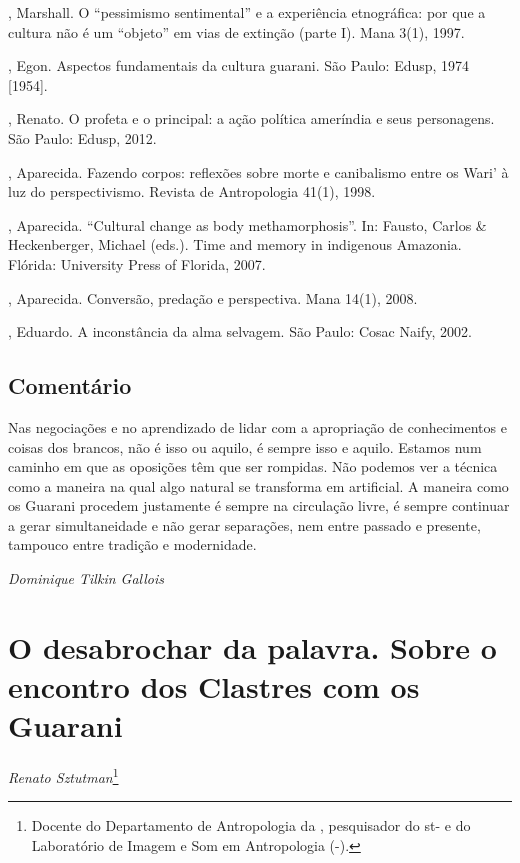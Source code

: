 \begin{Parskip}
, Marshall. O ``pessimismo sentimental'' e a experiência
etnográfica: por que a cultura não é um ``objeto'' em vias de extinção
(parte I). Mana 3(1), 1997.

, Egon. Aspectos fundamentais da cultura guarani. São Paulo:
Edusp, 1974 [1954].

, Renato. O profeta e o principal: a ação política ameríndia e
seus personagens. São Paulo: Edusp, 2012.

, Aparecida. Fazendo corpos: reflexões sobre morte e canibalismo
entre os Wari’ à luz do perspectivismo. Revista de Antropologia 41(1),
1998.

, Aparecida. ``Cultural change as body methamorphosis''. In: Fausto,
Carlos \& Heckenberger, Michael (eds.). Time and memory in indigenous
Amazonia. Flórida: University Press of Florida, 2007.

, Aparecida. Conversão, predação e perspectiva. Mana 14(1), 2008.

  , Eduardo. A inconstância da alma selvagem. São Paulo:
Cosac Naify, 2002.
\end{Parskip}

\section{Comentário}
Nas negociações e no aprendizado de lidar com a apropriação de
conhecimentos e coisas dos brancos, não é isso ou aquilo, é sempre isso
e aquilo. Estamos num caminho em que as oposições têm que ser rompidas.
Não podemos ver a técnica como a maneira na qual algo natural se
transforma em artificial. A maneira como os Guarani procedem justamente
é sempre na circulação livre, é sempre continuar a gerar simultaneidade
e não gerar separações, nem entre passado e presente, tampouco entre
tradição e modernidade.  
\medskip
\begin{flushright}
\emph{Dominique Tilkin Gallois}
\end{flushright}

\chapter{O desabrochar da palavra. Sobre o encontro dos Clastres com os
Guarani}
\begin{flushright}
\emph{Renato Sztutman}\footnote{Docente do Departamento de Antropologia da ,
pesquisador do st- e do Laboratório de Imagem e Som em
Antropologia (-).}
\end{flushright}
\medskip

